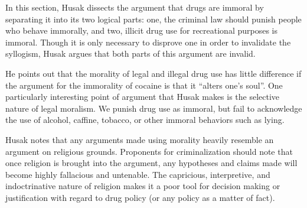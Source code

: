 \documentclass{article}
\begin{document}
\begin{enumerate}
  \par In this section, Husak dissects the argument that drugs are immoral by separating it into its two logical parts: one, the criminal law should punish people who behave immorally, and two, illicit drug use for recreational purposes is immoral. Though it is only necessary to disprove one in order to invalidate the syllogism, Husak argues that both parts of this argument are invalid.
  \par He points out that the morality of legal and illegal drug use has little difference if the argument for the immorality of cocaine is that it ``alters one’s soul''. One particularly interesting point of argument that Husak makes is the selective nature of legal moralism. We punish drug use as immoral, but fail to acknowledge the use of alcohol, caffine, tobacco, or other immoral behaviors such as lying.
  \par Husak notes that any arguments made using morality heavily resemble an argument on religious grounds. Proponents for criminalization should note that once religion is brought into the argument, any hypotheses and claims made will become highly fallacious and untenable. The capricious, interpretive, and indoctrinative nature of religion makes it a poor tool for decision making or justification with regard to drug policy (or any policy as a matter of fact).
\end{enumerate}
\end{document}
